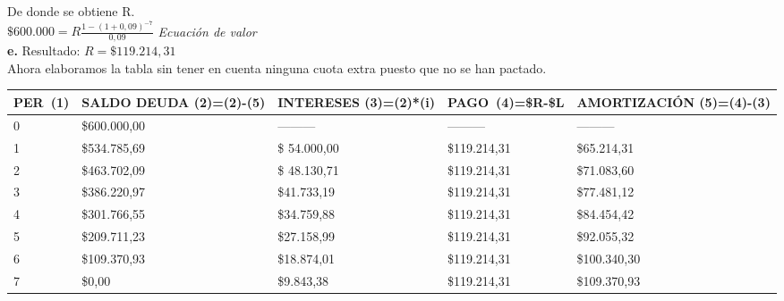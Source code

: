 De donde se obtiene R.\\
$\$600.000=R \frac{1-(1+0,09)^{-7}}{0,09}$ \hspace{35 pt} \textit{Ecuación de valor}\\

\textbf{e.} Resultado:
	$R=\$ 119.214,31$\\
Ahora elaboramos la tabla sin tener en cuenta ninguna cuota extra puesto que no se han pactado.


\begin{spacing}{1.1}
    \begin{center}
        \begin{tabular}{|p{1cm}|p{2cm}|p{2cm}|p{2cm}|p{3cm}|}
        \hline 
        \rowcolor{white!50}
            \textbf{PER\ (1)} & \textbf{SALDO DEUDA (2)=(2)-(5)} & \textbf{INTERESES  (3)=(2)*(i)}& \textbf{PAGO\ (4)=\$R-\$L }& \textbf{AMORTIZACIÓN  (5)=(4)-(3)} \\ \hline                        

            0 & \$600.000,00 & --------- & --------- & ---------\\ \hline 
            1 & \$534.785,69  &\$ 54.000,00  & \$119.214,31  & \$65.214,31 \\ \hline
            2 & \$463.702,09  &\$ 48.130,71  & \$119.214,31  & \$71.083,60 \\ \hline
            3 & \$386.220,97 & \$41.733,19  & \$119.214,31 & \$77.481,12 \\ \hline
            4 & \$301.766,55  & \$34.759,88  & \$119.214,31  & \$84.454,42 \\ \hline
            5 & \$209.711,23  & \$27.158,99  & \$119.214,31  & \$92.055,32 \\ \hline
            6 & \$109.370,93  & \$18.874,01  & \$119.214,31  & \$100.340,30 \\ \hline
            7 & \$0,00  & \$9.843,38  & \$119.214,31  & \$109.370,93 \\ \hline

 
\end{tabular}
\end{center}
\end{spacing}

